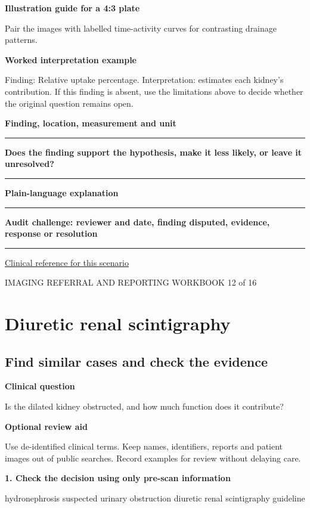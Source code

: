 \documentclass[11pt,a4paper]{article}
\newcommand{\record}[1]{\textbf{#1}\par\vspace{0.55\baselineskip}\hrule\vspace{0.35\baselineskip}}
\begin{document}
\textbf{Illustration guide for a 4:3 plate}\par Pair the images with labelled time-activity curves for contrasting drainage patterns.\par

\textbf{Worked interpretation example}\par Finding: Relative uptake percentage. Interpretation: estimates each kidney's contribution. If this finding is absent, use the limitations above to decide whether the original question remains open.\par

\record{Finding, location, measurement and unit}

\record{Does the finding support the hypothesis, make it less likely, or leave it unresolved?}

\record{Plain-language explanation}

\record{Audit challenge: reviewer and date, finding disputed, evidence, response or resolution}

\small\href{https://snmmi.org/Web/Web/Clinical-Practice/Procedure-Standards/Standards/Diuretic-Renal-Scintigraphy-in-Adults-With-Suspected-Upper-Urinary-Tract-Obstruction-1-0.aspx}{Clinical reference for this scenario}

\normalsize

\newpage

{\small IMAGING REFERRAL AND REPORTING WORKBOOK \hfill 12 of 16}

\section*{Diuretic renal scintigraphy}

\subsection*{Find similar cases and check the evidence}

\textbf{Clinical question}\par Is the dilated kidney obstructed, and how much function does it contribute?\par

\textbf{Optional review aid}\par Use de-identified clinical terms. Keep names, identifiers, reports and patient images out of public searches. Record examples for review without delaying care.\par

\textbf{1. Check the decision using only pre-scan information}\par hydronephrosis suspected urinary obstruction diuretic renal scintigraphy guideline\par
\end{document}
